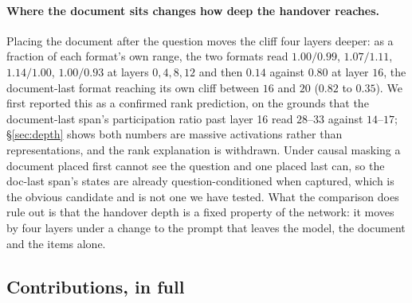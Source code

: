 \documentclass{article}
\begin{document}
\paragraph{Where the document sits changes how deep the handover reaches.}
Placing the document after the question moves the cliff four layers deeper: as a
fraction of each format's own range, the two formats read $1.00/0.99$,
$1.07/1.11$, $1.14/1.00$, $1.00/0.93$ at layers $0, 4, 8, 12$ and then
$\mathbf{0.14}$ against $\mathbf{0.80}$ at layer $16$, the document-last format
reaching its own cliff between $16$ and $20$ ($0.82$ to $0.35$). We first
reported this as a confirmed rank prediction, on the grounds that the
document-last span's participation ratio past layer 16 read $28$--$33$ against
$14$--$17$; \S\ref{sec:depth} shows both numbers are massive activations rather
than representations, and the rank explanation is withdrawn. Under causal
masking a document placed first cannot see the question and one placed last can,
so the doc-last span's states are already question-conditioned when captured,
which is the obvious candidate and is not one we have tested. What the
comparison does rule out is that the handover depth is a fixed property of the
network: it moves by four layers under a change to the prompt that leaves the
model, the document and the items alone.




\subsection{Contributions, in full}
\label{app:contrib}
\end{document}
